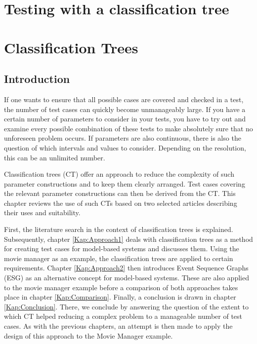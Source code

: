 \chapter{Testing with a classification tree}\label{sec:topic_5}

\chapter{Classification Trees}

\section{Introduction}

If one wants to ensure that all possible cases are covered and checked in a test, the number of test cases can quickly become unmanageably large. If you have a certain number of parameters to consider in your tests, you have to try out and examine every possible combination of these tests to make absolutely sure that no unforeseen problem occurs. If parameters are also continuous, there is also the question of which intervals and values to consider. Depending on the resolution, this can be an unlimited number.

Classification trees (CT) offer an approach to reduce the complexity of such parameter constructions and to keep them clearly arranged. Test cases covering the relevant parameter constructions can then be derived from the CT. This chapter reviews the use of such CTs based on two selected articles describing their uses and suitability.

First, the literature search in the context of classification trees is explained. Subsequently, chapter \ref{Kap:Approach1} deals with classification trees as a method for creating test cases for model-based systems and discusses them. Using the movie manager as an example, the classification trees are applied to certain requirements. Chapter \ref{Kap:Approach2} then introduces Event Sequence Graphs (ESG) as an alternative concept for model-based systems. These are also applied to the movie manager example before a comparison of both approaches takes place in chapter \ref{Kap:Comparison}. Finally, a conclusion is drawn in chapter \ref{Kap:Conclusion}. There, we conclude by answering the question of the extent to which CT helped reducing a complex problem to a manageable number of test cases. As with the previous chapters, an attempt is then made to apply the design of this approach to the Movie Manager example.

